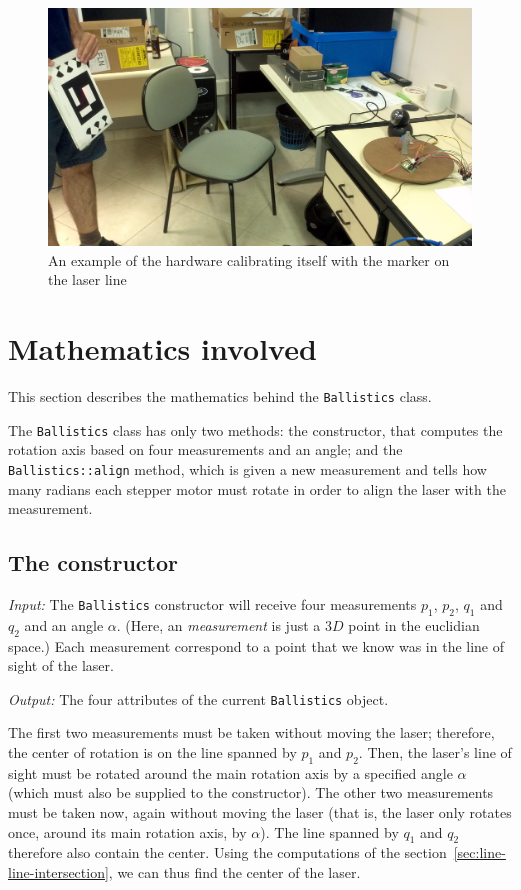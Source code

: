 \documentclass{article}
\newcommand\class[1]{\texttt{#1}}
\newcommand\method[1]{\texttt{#1}}
\begin{document}
\begin{figure}[h!]
    \includegraphics[scale=0.1]{imgs/marker_and_hardware.jpg}
    \caption{An example of the hardware calibrating itself with the marker on the 
laser line}
    \label{fig:h_and_m}
\end{figure}

\section{Mathematics involved}
\label{sec:math}

This section describes the mathematics behind the \class{Ballistics} class.

The \class{Ballistics} class has only two methods: the constructor,
that computes the rotation axis based on four measurements and an angle;
and the \method{Ballistics::align} method,
which is given a new measurement and tells how many radians
each stepper motor must rotate in order to align the laser with the measurement.

\subsection{The constructor}
\label{sec:ballistics-constructor}

\emph{Input:}
The \class{Ballistics} constructor will receive four measurements
$p_1$, $p_2$, $q_1$ and $q_2$ and an angle $\alpha$.
(Here, an \emph{measurement} is just a $3D$ point in the euclidian space.)
Each measurement correspond to a point
that we know was in the line of sight of the laser.

\noindent \emph{Output:}
The four attributes of the current \class{Ballistics} object.

The first two measurements must be taken without moving the laser;
therefore, the center of rotation is on the line spanned by $p_1$ and $p_2$.
Then, the laser's line of sight must be rotated around the main rotation axis
by a specified angle $\alpha$ (which must also be supplied to the constructor).
The other two measurements must be taken now, again without moving the laser
(that is, the laser only rotates once, around its main rotation axis, by $\alpha$).
The line spanned by $q_1$ and $q_2$ therefore also contain the center.
Using the computations of the section~\ref{sec:line-line-intersection},
we can thus find the center of the laser.
\end{document}
